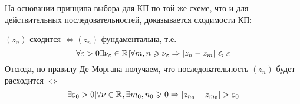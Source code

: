 \begin{note}
  На основании принципа выбора для КП по той же схеме, что и для действительных последовательностей,
  доказывается  сходимости КП:

  $(z_n)$ сходится $\Leftrightarrow (z_n)$ фундаментальна, т.е.
  \begin{equation}
    \label{eq:lecture10-05}
    \forall \varepsilon > 0 \exists \nu_{\varepsilon} \in \mathbb{R}^{} \vert \forall m, n \geqslant
    \nu_{\varepsilon} \Rightarrow \left\lvert z_n - z_m \right\rvert \leqslant \varepsilon
  \end{equation}
  Отсюда, по правилу Де Моргана получаем, что последовательность $(z_n)$ будет расходится
  $\Leftrightarrow$
  \begin{equation}
    \exists \varepsilon_0 > 0 \vert \forall \nu \in \mathbb{R}^{}, \exists m_0, n_0 \geqslant 0 \Rightarrow
    \left\lvert z_{n_0} - z_{m_0} \right\rvert > \varepsilon_0
  \end{equation}
\end{note}
